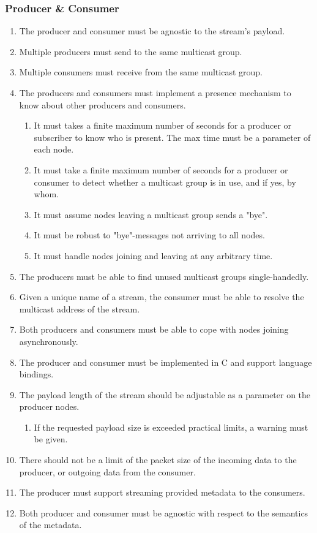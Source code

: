 \subsubsection{Producer \& Consumer}
\begin{enumerate}
	\item The producer and consumer must be agnostic to the stream's payload.
	\item Multiple producers must send to the same multicast group.
	\item Multiple consumers must receive from the same multicast group.
	\item The producers and consumers must implement a presence mechanism to know about other producers and consumers.
	\begin{enumerate}
		\item It must takes a finite maximum number of seconds for a producer or subscriber to know who is present. The max time must be a parameter of each node.
		\item It must take a finite maximum number of seconds for a producer or consumer to detect whether a multicast group is in use, and if yes, by whom.
		\item It must assume nodes leaving a multicast group sends a "bye".
		\item It must be robust to "bye"-messages not arriving to all nodes.
		\item It must handle nodes joining and leaving at any arbitrary time.
	\end{enumerate}
	\item The producers must be able to find unused multicast groups single-handedly.
	\item Given a unique name of a stream, the consumer must be able to resolve the multicast address of the stream.
	\item Both producers and consumers must be able to cope with nodes joining asynchronously.
	\item The producer and consumer must be implemented in C and support language bindings.
	\item The payload length of the stream should be adjustable as a parameter on the producer nodes.
		\begin{enumerate}
			\item If the requested payload size is exceeded practical limits, a warning must be given.
		\end{enumerate}
	\item There should not be a limit of the packet size of the incoming data to the producer, or outgoing data from the consumer.
	\item The producer must support streaming provided metadata to the consumers.
	\item Both producer and consumer must be agnostic with respect to the semantics of the metadata.
\end{enumerate}

